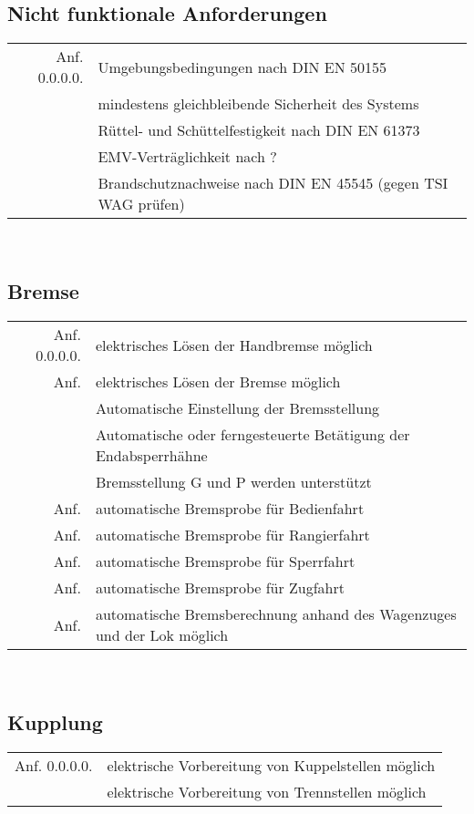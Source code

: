 \subsection{Nicht funktionale Anforderungen}
\begin{tabular}{r|l}
	\hline
	Anf. 0.0.0.0.	& 	Umgebungsbedingungen nach DIN EN 50155\\
					& 	mindestens gleichbleibende Sicherheit des Systems\\
					& Rüttel- und Schüttelfestigkeit nach DIN EN 61373\\
					& EMV-Verträglichkeit nach ?\\
	                &Brandschutznachweise nach DIN EN 45545 (gegen TSI WAG prüfen)\\
	\hline
\end{tabular} \\
\subsection{Bremse}
\begin{tabular}{r|l}
	\hline
	Anf. 0.0.0.0.	&	elektrisches Lösen der Handbremse möglich 	\\
	Anf.			&	elektrisches Lösen der Bremse möglich		\\
                    & Automatische Einstellung der Bremsstellung\\
                    & Automatische oder ferngesteuerte Betätigung der Endabsperrhähne\\
                    & Bremsstellung G und P werden unterstützt\\
	Anf.			&	automatische Bremsprobe für Bedienfahrt		\\
	Anf.			&	automatische Bremsprobe für Rangierfahrt	\\
	Anf.			&	automatische Bremsprobe für Sperrfahrt		\\
	Anf.			&	automatische Bremsprobe für Zugfahrt		\\
	Anf.			&	automatische Bremsberechnung anhand des Wagenzuges und der Lok möglich		\\
	
	\hline
\end{tabular} \\
\subsection{Kupplung}
\begin{tabular}{r|l}
	\hline
	Anf. 0.0.0.0.	&	elektrische Vorbereitung von Kuppelstellen möglich\\
					&	elektrische Vorbereitung von Trennstellen möglich\\
	\hline
\end{tabular}\\

